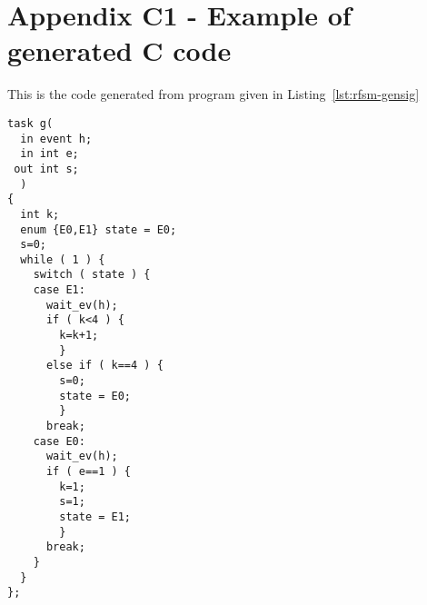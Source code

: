 \chapter*{Appendix C1 - Example of generated C code}  
\label{cha:ex1-c}

This is the code generated from program given in Listing~\ref{lst:rfsm-gensig} 

\begin{lstlisting}[language=ctask,frame=single,numbers=none,basicstyle=\small]
task g(
  in event h;
  in int e;
 out int s;
  )
{
  int k;
  enum {E0,E1} state = E0;
  s=0;
  while ( 1 ) {
    switch ( state ) {
    case E1:
      wait_ev(h);
      if ( k<4 ) {
        k=k+1;
        }
      else if ( k==4 ) {
        s=0;
        state = E0;
        }
      break;
    case E0:
      wait_ev(h);
      if ( e==1 ) {
        k=1;
        s=1;
        state = E1;
        }
      break;
    }
  }
};
\end{lstlisting}
